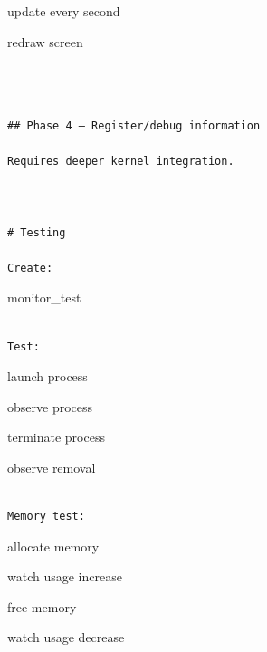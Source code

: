 \documentclass[
  oneside,
  openany]{book}
\begin{document}
update every second

redraw screen

\begin{verbatim}

---

## Phase 4 — Register/debug information

Requires deeper kernel integration.

---

# Testing

Create:
\end{verbatim}

monitor\_test

\begin{verbatim}

Test:
\end{verbatim}

launch process

observe process

terminate process

observe removal

\begin{verbatim}

Memory test:
\end{verbatim}

allocate memory

watch usage increase

free memory

watch usage decrease
\end{document}
